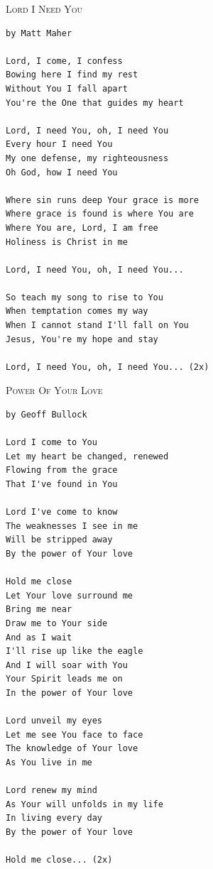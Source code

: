 \documentclass[10pt,oneside,footinclude=true,headinclude=true]{scrbook} %
\newcommand\songtitle[1]{
	\hspace*{-3.7mm}\Large\textsc{#1}
}
\begin{document}

\bigskip
\medskip
\songtitle{Lord I Need You}
\begin{verbatim}
by Matt Maher

Lord, I come, I confess
Bowing here I find my rest
Without You I fall apart
You're the One that guides my heart

Lord, I need You, oh, I need You
Every hour I need You
My one defense, my righteousness
Oh God, how I need You

Where sin runs deep Your grace is more
Where grace is found is where You are
Where You are, Lord, I am free
Holiness is Christ in me

Lord, I need You, oh, I need You...

So teach my song to rise to You
When temptation comes my way
When I cannot stand I'll fall on You
Jesus, You're my hope and stay

Lord, I need You, oh, I need You... (2x)
\end{verbatim}


\newpage
\songtitle{Power Of Your Love}
\begin{verbatim}
by Geoff Bullock

Lord I come to You
Let my heart be changed, renewed
Flowing from the grace
That I've found in You

Lord I've come to know
The weaknesses I see in me
Will be stripped away
By the power of Your love

Hold me close
Let Your love surround me
Bring me near
Draw me to Your side
And as I wait
I'll rise up like the eagle
And I will soar with You
Your Spirit leads me on
In the power of Your love

Lord unveil my eyes
Let me see You face to face
The knowledge of Your love
As You live in me

Lord renew my mind
As Your will unfolds in my life
In living every day
By the power of Your love

Hold me close... (2x)
\end{verbatim}

\end{document}
